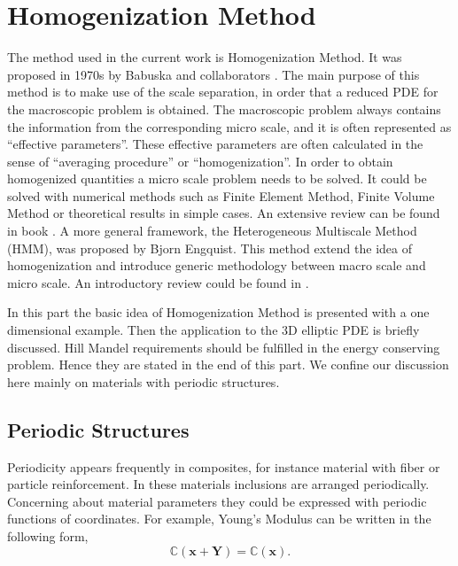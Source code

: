 %
%
%
%
%
%

\chapter{Homogenization Method}
The method used in the current work is Homogenization Method. It was proposed in 1970s by Babuska and collaborators \citep{EPFL-ARTICLE-184958}. The main purpose of this method is to make use of the scale separation, in order that a reduced PDE for the macroscopic problem is obtained. The macroscopic problem always contains the information from the corresponding micro scale, and it is often represented as ``effective parameters''. These effective parameters are often calculated in the sense of ``averaging procedure'' or ``homogenization''. In order to obtain homogenized quantities a micro scale problem needs to be solved. It could be solved with numerical methods such as Finite Element Method, Finite Volume Method or theoretical results in simple cases. An extensive review  can be found in book \citep{efendiev2009multiscale}. A more general framework, the Heterogeneous Multiscale Method (HMM), was proposed by Bjorn Engquist. This method extend the idea of homogenization and introduce generic methodology between macro scale and micro scale. An introductory review could be found in \citep{weinan2007heterogeneous}.

In this part the basic idea of Homogenization Method is presented with a one dimensional example. Then the application to the 3D elliptic PDE is briefly discussed. Hill Mandel requirements should be fulfilled in the energy conserving problem. Hence they are stated in the end of this part. We confine our discussion here mainly on materials with periodic structures. 

\section{Periodic Structures}
Periodicity appears frequently in composites, for instance material with fiber or particle reinforcement. In these materials inclusions are arranged periodically. Concerning about material parameters they could be expressed with periodic functions of coordinates. For example, Young's Modulus can be written in the following form,
%
\begin{equation}
\label{eq:periodic 1}
\mathbb{C}(\mathbf{x}+\mathbf{Y}) = \mathbb{C}(\mathbf{x}).
\end{equation}
%

